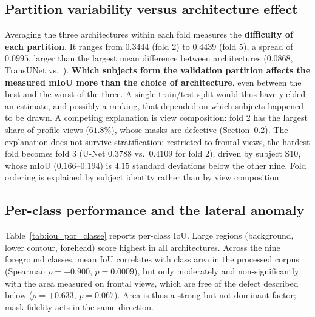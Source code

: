 \subsection{Partition variability versus architecture effect} \label{subsec:res_variabilidade_particoes}

Averaging the three architectures within each fold measures the \textbf{difficulty of each partition}.
It ranges from $0.3444$ (fold 2) to $0.4439$ (fold 5), a spread of $\mathbf{0.0995}$, larger than the largest mean difference between architectures ($0.0868$, TransUNet vs.\ \swinp{}).
\textbf{Which subjects form the validation partition affects the measured mIoU more than the choice of architecture}, even between the best and the worst of the three.
A single train/test split would thus have yielded an estimate, and possibly a ranking, that depended on which subjects happened to be drawn.
A competing explanation is view composition: fold 2 has the largest share of profile views ($61.8\%$), whose masks are defective (Section~\ref{subsec:res_anomalia_lateral}).
The explanation does not survive stratification: restricted to frontal views, the hardest fold becomes fold 3 (U-Net $0.3788$ vs.\ $0.4109$ for fold 2), driven by subject S10, whose mIoU ($0.166$--$0.194$) is $4.15$ standard deviations below the other nine.
Fold ordering is explained by subject identity rather than by view composition.

\subsection{Per-class performance and the lateral anomaly} \label{subsec:res_anomalia_lateral}

Table~\ref{tab:iou_por_classe} reports per-class IoU.
Large regions (background, lower contour, forehead) score highest in all architectures.
Across the nine foreground classes, mean IoU correlates with class area in the processed corpus (Spearman $\rho=+0.900$, $p=0.0009$), but only moderately and non-significantly with the area measured on frontal views, which are free of the defect described below ($\rho=+0.633$, $p=0.067$).
Area is thus a strong but not dominant factor; mask fidelity acts in the same direction.

